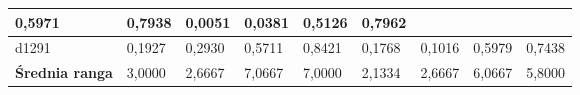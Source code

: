 \begin{table}[ht]
{\begin{tabular}{|l|llll|llll|}
    \multicolumn{1}{l|}{0,5971 } &
    0,7938  &
    \multicolumn{1}{l|}{0,0051 } &
    \multicolumn{1}{l|}{0,0381 } &
    \multicolumn{1}{l|}{0,5126 } &
    0,7962  \\ \hline
  d1291 &
    \multicolumn{1}{l|}{0,1927 } &
    \multicolumn{1}{l|}{0,2930 } &
    \multicolumn{1}{l|}{0,5711 } &
    0,8421  &
    \multicolumn{1}{l|}{0,1768 } &
    \multicolumn{1}{l|}{0,1016 } &
    \multicolumn{1}{l|}{0,5979 } &
    0,7438  \\ \hline\hline
    \multicolumn{1}{|l|}{\textbf{Średnia ranga}} &
    \multicolumn{1}{l|}{3,0000} &
    \multicolumn{1}{l|}{2,6667} &
    \multicolumn{1}{l|}{7,0667} &
    \multicolumn{1}{l|}{7,0000} &
    \multicolumn{1}{l|}{2,1334} &
    \multicolumn{1}{l|}{2,6667} &
    \multicolumn{1}{l|}{6,0667} &
    \multicolumn{1}{l|}{5,8000} \\ \hline
  \end{tabular}%
  }
\end{table}

